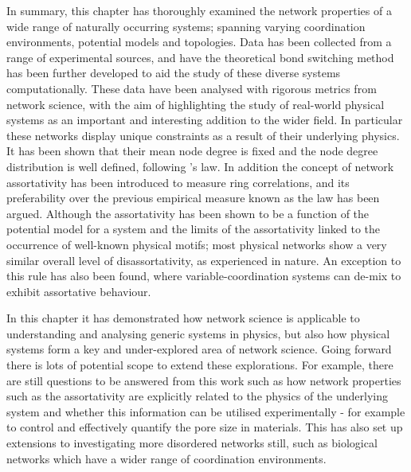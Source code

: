 In summary, this chapter has thoroughly examined the network properties of a wide range of naturally occurring \td{} systems; spanning varying coordination environments, potential models and topologies.
Data has been collected from a range of experimental sources, and have the theoretical bond switching method has been further developed to aid the study of these diverse systems computationally.
These data have been analysed with rigorous metrics from network science, with the aim of highlighting the study of real\--world physical systems as an important and interesting addition to the wider field.
In particular these networks display unique constraints as a result of their underlying physics.
It has been shown that their mean node degree is fixed and the node degree distribution is well defined, following \lm's law.
In addition the concept of network assortativity has been introduced to measure ring correlations, and its preferability over the previous empirical measure known as the \aw{} law has been argued.
Although the assortativity has been shown to be a function of the potential model for a system and the limits of the assortativity linked to the occurrence of well\--known physical motifs; most physical networks show a very similar overall level of disassortativity, as experienced in nature.
An exception to this rule has also been found, where variable\--coordination systems can de\--mix to exhibit assortative behaviour.

In this chapter it has demonstrated how network science is applicable to understanding and analysing generic systems in physics, but also how physical systems form a key and under\--explored area of network science.
Going forward there is lots of potential scope to extend these explorations.
For example, there are still questions to be answered from this work such as how network properties such as the assortativity are explicitly related to the physics of the underlying system and whether this information can be utilised experimentally \-- for example to control and effectively quantify the pore size in materials.
This has also set up extensions to investigating more disordered networks still, such as biological networks which have a wider range of coordination environments.



 




